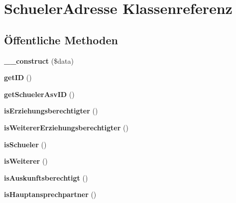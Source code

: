 \hypertarget{class_schueler_adresse}{}\section{Schueler\+Adresse Klassenreferenz}
\label{class_schueler_adresse}
\subsection*{Öffentliche Methoden}
\begin{DoxyCompactItemize}
\item 
\mbox{\label{class_schueler_adresse_a0875dc16b5838d3700eadbd6e510f53c}} 
{\bfseries \+\_\+\+\_\+construct} (\$data)
\item 
\mbox{\label{class_schueler_adresse_a98fb43a9795e832847490dcffb75c6ae}} 
{\bfseries get\+ID} ()
\item 
\mbox{\label{class_schueler_adresse_acf4844f33a1d259242616dab9d041ea2}} 
{\bfseries get\+Schueler\+Asv\+ID} ()
\item 
\mbox{\label{class_schueler_adresse_a231a4b70a11e8deaa1d63eb18f48dff4}} 
{\bfseries is\+Erziehungsberechtigter} ()
\item 
\mbox{\label{class_schueler_adresse_a7314ee471dca663db9ce9b4f2fb85360}} 
{\bfseries is\+Weiterer\+Erziehungsberechtigter} ()
\item 
\mbox{\label{class_schueler_adresse_a568d71692907bf9fdf48802adb8be8d9}} 
{\bfseries is\+Schueler} ()
\item 
\mbox{\label{class_schueler_adresse_af6347e93e08771986ac64163f255ebd6}} 
{\bfseries is\+Weiterer} ()
\item 
\mbox{\label{class_schueler_adresse_ae325341ed5b7a502a0aba322b30696e0}} 
{\bfseries is\+Auskunftsberechtigt} ()
\item 
\mbox{\label{class_schueler_adresse_a9276719db3fedaef1700a3110cc8f259}} 
{\bfseries is\+Hauptansprechpartner} ()

\end{DoxyCompactItemize}
